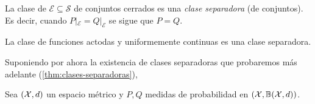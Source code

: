\documentclass[main.tex]{subfiles}
\begin{document}
\begin{corollary}
    La clase de $\mathcal{E}\subseteq\mathcal{S}$ de conjuntos cerrados es una \textit{clase separadora} (de conjuntos). Es decir, cuando $P|_\mathcal{E} = Q|_\mathcal{E}$ se sigue que $P=Q$.
\end{corollary}

\begin{theorem}
    La clase de funciones actodas y uniformemente continuas es una clase separadora.
\end{theorem}

Suponiendo por ahora la existencia de clases separadoras que probaremos más adelante (\eqref{thm:clases-separadoras}),


\begin{theorem}\label{thm:clases-separadoras}
    Sea $(\operatorname{\mathcal{X}}, d)$ un espacio métrico y $P, Q$ medidas de probabilidad en $(\operatorname{\mathcal{X}}, \mathbb{B}(\operatorname{\mathcal{X}}, d))$.
\end{theorem}
\end{document}
